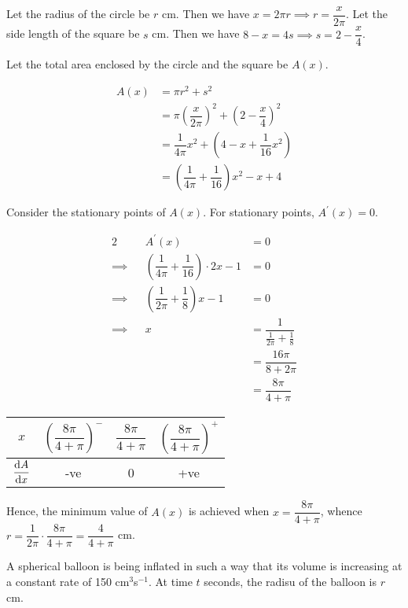 \documentclass{echw}
\begin{document}
    \solution
        Let the radius of the circle be $r$ cm. Then we have $x = 2\pi r \implies r = \dfrac{x}{2\pi}$. Let the side length of the square be $s$ cm. Then we have $8-x=4s \implies s = 2-\dfrac{x}4$.

        Let the total area enclosed by the circle and the square be $A(x)$.

        \begin{align*}
            A(x) &= \pi r^2 + s^2\\
            &= \pi \left(\dfrac{x}{2\pi}\right)^2 + \left(2-\dfrac{x}4\right)^2\\
            &= \dfrac1{4\pi}x^2 + \left(4 - x + \dfrac1{16}x^2\right)\\
            &= \left(\dfrac1{4\pi} + \dfrac1{16}\right)x^2 - x + 4
        \end{align*}

        Consider the stationary points of $A(x)$. For stationary points, $A^\prime(x) = 0$.

        \begin{alignat*}{2}
            &&A^\prime(x) &= 0\\
            \implies&&\left(\dfrac1{4\pi} + \dfrac1{16}\right)\cdot 2x - 1 &= 0\\
            \implies&&\left(\dfrac1{2\pi} + \dfrac1{8}\right)x - 1 &= 0\\
            \implies&& x &= \dfrac1{\tfrac1{2\pi} + \tfrac1{8}}\\
            && &= \dfrac{16\pi}{8 + 2\pi}\\
            && &=\dfrac{8\pi}{4 + \pi}
        \end{alignat*}

        \begin{table}[h]
            \centering
            \begin{tabular}{|c|c|c|c|}
            \hline
            $x$ & $\left(\dfrac{8\pi}{4 + \pi}\right)^-$ & $\dfrac{8\pi}{4 + \pi}$ & $\left(\dfrac{8\pi}{4 + \pi}\right)^+$ \\\hline
            $\dfrac{\mathrm{d} A}{\mathrm{d} x}$ & -ve   & 0 & +ve   \\[1ex]\hline
            \end{tabular}
        \end{table}

        Hence, the minimum value of $A(x)$ is achieved when $x = \dfrac{8\pi}{4 + \pi}$, whence $r = \dfrac{1}{2\pi} \cdot \dfrac{8\pi}{4 + \pi} = \dfrac{4}{4+\pi}$ cm.

    \problem{}
        A spherical balloon is being inflated in such a way that its volume is increasing at a constant rate of 150 cm$^3$s$^{-1}$. At time $t$ seconds, the radisu of the balloon is $r$ cm.
\end{document}
